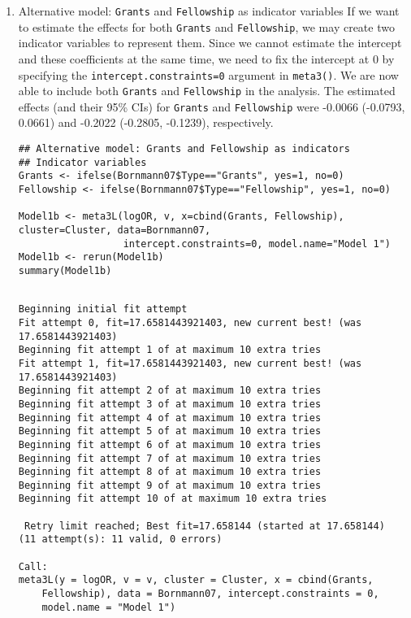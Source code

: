 \documentclass[11pt]{article}
\begin{document}
\begin{enumerate}
\item Alternative model: \texttt{Grants} and \texttt{Fellowship} as indicator variables
\label{sec:orgec06dae}
If we want to estimate the effects for both \texttt{Grants} and \texttt{Fellowship}, we may create two indicator variables to represent them. Since we cannot estimate the intercept and these coefficients at the same time, we need to fix the intercept at 0 by specifying the \texttt{intercept.constraints=0} argument in \texttt{meta3()}. We are now able to include both \texttt{Grants} and \texttt{Fellowship} in the analysis. The estimated effects (and their 95\% CIs) for \texttt{Grants} and \texttt{Fellowship} were -0.0066 (-0.0793, 0.0661) and -0.2022 (-0.2805, -0.1239), respectively.

\begin{verbatim}
## Alternative model: Grants and Fellowship as indicators  
## Indicator variables
Grants <- ifelse(Bornmann07$Type=="Grants", yes=1, no=0)
Fellowship <- ifelse(Bornmann07$Type=="Fellowship", yes=1, no=0)

Model1b <- meta3L(logOR, v, x=cbind(Grants, Fellowship), cluster=Cluster, data=Bornmann07,
                  intercept.constraints=0, model.name="Model 1")
Model1b <- rerun(Model1b)
summary(Model1b)
\end{verbatim}

\begin{verbatim}

Beginning initial fit attempt
Fit attempt 0, fit=17.6581443921403, new current best! (was 17.6581443921403)
Beginning fit attempt 1 of at maximum 10 extra tries                         
Fit attempt 1, fit=17.6581443921403, new current best! (was 17.6581443921403)
Beginning fit attempt 2 of at maximum 10 extra tries                         
Beginning fit attempt 3 of at maximum 10 extra tries
Beginning fit attempt 4 of at maximum 10 extra tries
Beginning fit attempt 5 of at maximum 10 extra tries
Beginning fit attempt 6 of at maximum 10 extra tries
Beginning fit attempt 7 of at maximum 10 extra tries
Beginning fit attempt 8 of at maximum 10 extra tries
Beginning fit attempt 9 of at maximum 10 extra tries
Beginning fit attempt 10 of at maximum 10 extra tries
                                                     
 Retry limit reached; Best fit=17.658144 (started at 17.658144)  (11 attempt(s): 11 valid, 0 errors)

Call:
meta3L(y = logOR, v = v, cluster = Cluster, x = cbind(Grants, 
    Fellowship), data = Bornmann07, intercept.constraints = 0, 
    model.name = "Model 1")


\end{verbatim}
\end{enumerate}
\end{document}
